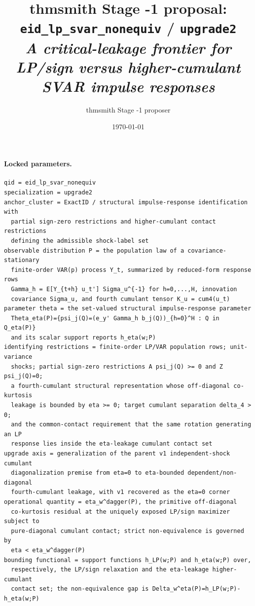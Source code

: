 \documentclass[11pt]{article}
\title{thmsmith Stage -1 proposal: \texttt{eid\_lp\_svar\_nonequiv} / \texttt{upgrade2}%
  \\ \large\textit{A critical-leakage frontier for LP/sign versus higher-cumulant SVAR impulse responses}}
\author{thmsmith Stage -1 proposer}
\date{\today}
\theoremstyle{definition}
\theoremstyle{plain}
\theoremstyle{remark}
\begin{document}
\maketitle


\paragraph{Locked parameters.}
\begin{verbatim}
qid = eid_lp_svar_nonequiv
specialization = upgrade2
anchor_cluster = ExactID / structural impulse-response identification with
  partial sign-zero restrictions and higher-cumulant contact restrictions
  defining the admissible shock-label set
observable distribution P = the population law of a covariance-stationary
  finite-order VAR(p) process Y_t, summarized by reduced-form response rows
  Gamma_h = E[Y_{t+h} u_t'] Sigma_u^{-1} for h=0,...,H, innovation
  covariance Sigma_u, and fourth cumulant tensor K_u = cum4(u_t)
parameter theta = the set-valued structural impulse-response parameter
  Theta_eta(P)={psi_j(Q)=(e_y' Gamma_h b_j(Q))_{h=0}^H : Q in Q_eta(P)}
  and its scalar support reports h_eta(w;P)
identifying restrictions = finite-order LP/VAR population rows; unit-variance
  shocks; partial sign-zero restrictions A psi_j(Q) >= 0 and Z psi_j(Q)=0;
  a fourth-cumulant structural representation whose off-diagonal co-kurtosis
  leakage is bounded by eta >= 0; target cumulant separation delta_4 > 0;
  and the common-contact requirement that the same rotation generating an LP
  response lies inside the eta-leakage cumulant contact set
upgrade axis = generalization of the parent v1 independent-shock cumulant
  diagonalization premise from eta=0 to eta-bounded dependent/non-diagonal
  fourth-cumulant leakage, with v1 recovered as the eta=0 corner
operational quantity = eta_w^dagger(P), the primitive off-diagonal
  co-kurtosis residual at the uniquely exposed LP/sign maximizer subject to
  pure-diagonal cumulant contact; strict non-equivalence is governed by
  eta < eta_w^dagger(P)
bounding functional = support functions h_LP(w;P) and h_eta(w;P) over,
  respectively, the LP/sign relaxation and the eta-leakage higher-cumulant
  contact set; the non-equivalence gap is Delta_w^eta(P)=h_LP(w;P)-h_eta(w;P)
\end{verbatim}
\end{document}
